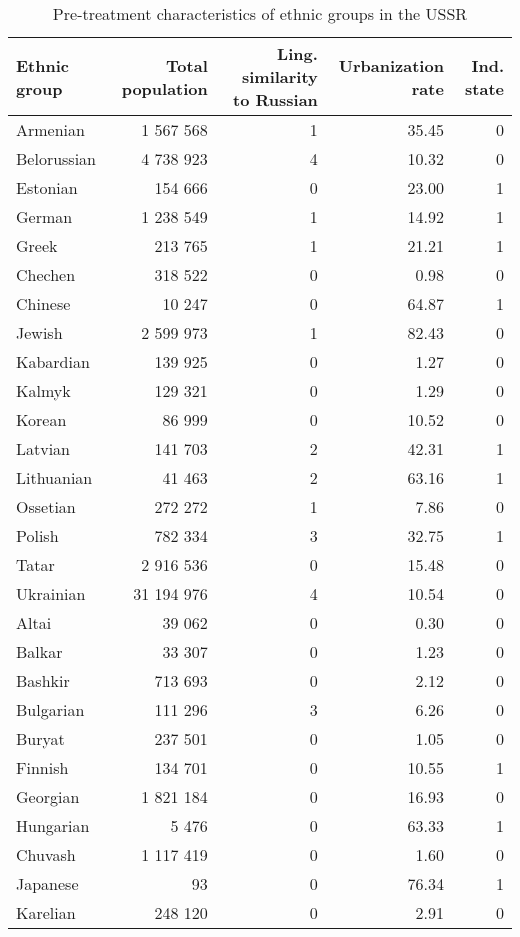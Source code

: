 \begin{table}[!h]

\caption{\label{tab:sc_predictors}Pre-treatment characteristics of ethnic groups in the USSR}
\centering
\begin{threeparttable}
\begin{tabular}{lrrrr}
\toprule
Ethnic group & Total population & Ling. similarity to Russian & Urbanization rate & Ind. state\\
\midrule
Armenian & 1 567 568 & 1 & 35.45 & 0\\
Belorussian & 4 738 923 & 4 & 10.32 & 0\\
Estonian & 154 666 & 0 & 23.00 & 1\\
German & 1 238 549 & 1 & 14.92 & 1\\
Greek & 213 765 & 1 & 21.21 & 1\\
Chechen & 318 522 & 0 & 0.98 & 0\\
Chinese & 10 247 & 0 & 64.87 & 1\\
Jewish & 2 599 973 & 1 & 82.43 & 0\\
Kabardian & 139 925 & 0 & 1.27 & 0\\
Kalmyk & 129 321 & 0 & 1.29 & 0\\
Korean & 86 999 & 0 & 10.52 & 0\\
Latvian & 141 703 & 2 & 42.31 & 1\\
Lithuanian & 41 463 & 2 & 63.16 & 1\\
Ossetian & 272 272 & 1 & 7.86 & 0\\
Polish & 782 334 & 3 & 32.75 & 1\\
Tatar & 2 916 536 & 0 & 15.48 & 0\\
Ukrainian & 31 194 976 & 4 & 10.54 & 0\\
Altai & 39 062 & 0 & 0.30 & 0\\
Balkar & 33 307 & 0 & 1.23 & 0\\
Bashkir & 713 693 & 0 & 2.12 & 0\\
Bulgarian & 111 296 & 3 & 6.26 & 0\\
Buryat & 237 501 & 0 & 1.05 & 0\\
Finnish & 134 701 & 0 & 10.55 & 1\\
Georgian & 1 821 184 & 0 & 16.93 & 0\\
Hungarian & 5 476 & 0 & 63.33 & 1\\
Chuvash & 1 117 419 & 0 & 1.60 & 0\\
Japanese & 93 & 0 & 76.34 & 1\\
Karelian & 248 120 & 0 & 2.91 & 0\\

\end{tabular}
\end{threeparttable}
\end{table}
